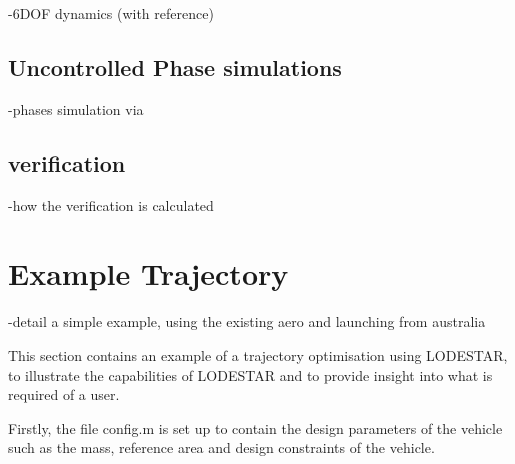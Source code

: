 \documentclass[a4paper,11pt]{book}
\begin{document}
-6DOF dynamics (with reference)

\section{Uncontrolled Phase simulations}
-phases simulation via 

\section{verification}
-how the verification is calculated

\chapter{Example Trajectory}

-detail a simple example, using the existing aero and launching from australia


This section contains an example of a trajectory optimisation using LODESTAR, to illustrate the capabilities of LODESTAR and to provide insight into what is required of a user. 

Firstly, the file config.m is set up to contain the design parameters of the vehicle such as the mass, reference area and design constraints of the vehicle. 
\end{document}
